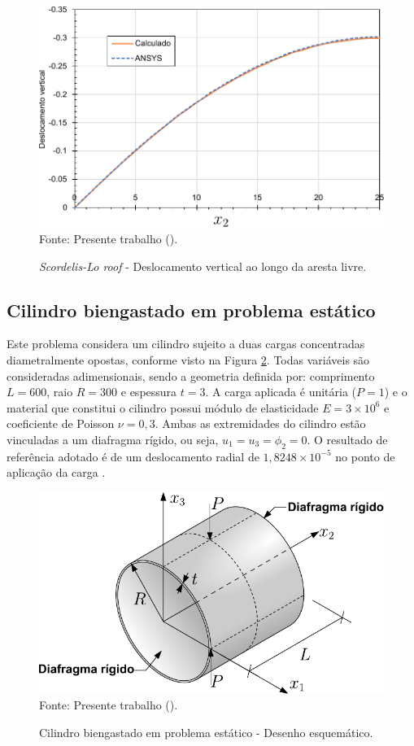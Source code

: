 \begin{figure}[h!]
    \centering
    \caption{\textit{Scordelis-Lo roof} - Deslocamento vertical ao longo da aresta livre.}
    \includegraphics[width=0.6\linewidth]{Figuras/scordelis/deslocamento.pdf}
    \\Fonte: Presente trabalho (\the\year).
    \label{fig:scordelis-graph}
\end{figure}

\subsection{Cilindro biengastado em problema estático} \label{Ap:Shell-cyl}

Este problema considera um cilindro sujeito a duas cargas concentradas diametralmente opostas, conforme visto na Figura \ref{fig:cylinder-shell}. Todas variáveis são consideradas adimensionais, sendo a geometria definida por: comprimento $L=600$, raio $R=300$ e espessura $t=3$. A carga aplicada é unitária ($P=1$) e o material que constitui o cilindro possui módulo de elasticidade $E=3\times10^6$ e coeficiente de Poisson $\nu=0,3$. Ambas as extremidades do cilindro estão vinculadas a um diafragma rígido, ou seja, $u_1=u_3=\phi_2=0$. O resultado de referência adotado é de um deslocamento radial de $1,8248\times10^{-5}$ no ponto de aplicação da carga \cite{BELYTSCHKO1985221,CHAUDINH2023110222,ZHOU2022108568}.

\begin{figure}[h!]
    \centering
    \caption{Cilindro biengastado em problema estático - Desenho esquemático.}
    \includegraphics[width=0.65\linewidth]{Figuras/cylinder-shell/cylinder.pdf}
    \\Fonte: Presente trabalho (\the\year).
    \label{fig:cylinder-shell}
\end{figure}

